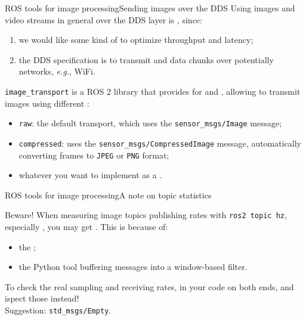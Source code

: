\begin{frame}{ROS tools for image processing}{Sending images over the DDS}
  Using images and video streams in general over the DDS layer is , since:
  \begin{enumerate}
    \item we would like some kind of  to optimize throughput and latency;
    \item the DDS specification is  to transmit  and  data chunks over potentially  networks, \emph{e.g.}, WiFi.
  \end{enumerate}
  \texttt{image\_transport} is a ROS 2 library that provides  for  and , allowing to transmit images using different :
  \begin{itemize}
    \item \texttt{raw}: the default transport, which uses the \texttt{sensor\_msgs/Image} message;
    \item \texttt{compressed}: uses the \texttt{sensor\_msgs/CompressedImage} message, automatically converting frames to \texttt{JPEG} or \texttt{PNG} format;
    \item whatever you want to implement as a .
  \end{itemize}
\end{frame}
\begin{frame}{ROS tools for image processing}{A note on topic statistics}
  \begin{alertblock}{Beware!}
    When measuring image topics publishing rates with \texttt{ros2 topic hz}, especially , you may get . This is because of:
    \begin{itemize}
      \item the ;
      \item the  Python tool buffering messages into a window-based filter.
    \end{itemize}
    To check the real sampling and receiving rates,  in your code on both ends, and ispect those instead!\\
    Suggestion: \texttt{std\_msgs/Empty}.
  \end{alertblock}
\end{frame}
